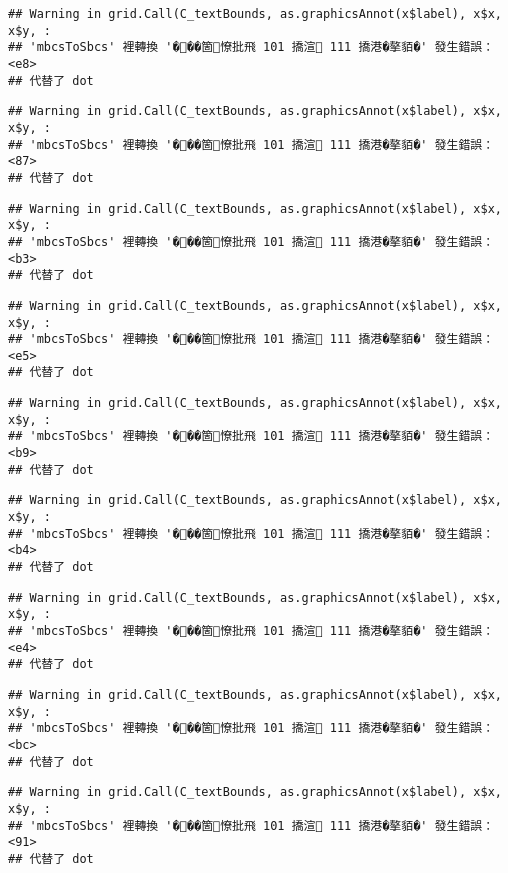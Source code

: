 \documentclass[
]{article}
\begin{document}
\begin{verbatim}
## Warning in grid.Call(C_textBounds, as.graphicsAnnot(x$label), x$x, x$y, :
## 'mbcsToSbcs' 裡轉換 '���箇憭批飛 101 撟渲 111 撟港�摮貊�' 發生錯誤：<e8>
## 代替了 dot
\end{verbatim}

\begin{verbatim}
## Warning in grid.Call(C_textBounds, as.graphicsAnnot(x$label), x$x, x$y, :
## 'mbcsToSbcs' 裡轉換 '���箇憭批飛 101 撟渲 111 撟港�摮貊�' 發生錯誤：<87>
## 代替了 dot
\end{verbatim}

\begin{verbatim}
## Warning in grid.Call(C_textBounds, as.graphicsAnnot(x$label), x$x, x$y, :
## 'mbcsToSbcs' 裡轉換 '���箇憭批飛 101 撟渲 111 撟港�摮貊�' 發生錯誤：<b3>
## 代替了 dot
\end{verbatim}

\begin{verbatim}
## Warning in grid.Call(C_textBounds, as.graphicsAnnot(x$label), x$x, x$y, :
## 'mbcsToSbcs' 裡轉換 '���箇憭批飛 101 撟渲 111 撟港�摮貊�' 發生錯誤：<e5>
## 代替了 dot
\end{verbatim}

\begin{verbatim}
## Warning in grid.Call(C_textBounds, as.graphicsAnnot(x$label), x$x, x$y, :
## 'mbcsToSbcs' 裡轉換 '���箇憭批飛 101 撟渲 111 撟港�摮貊�' 發生錯誤：<b9>
## 代替了 dot
\end{verbatim}

\begin{verbatim}
## Warning in grid.Call(C_textBounds, as.graphicsAnnot(x$label), x$x, x$y, :
## 'mbcsToSbcs' 裡轉換 '���箇憭批飛 101 撟渲 111 撟港�摮貊�' 發生錯誤：<b4>
## 代替了 dot
\end{verbatim}

\begin{verbatim}
## Warning in grid.Call(C_textBounds, as.graphicsAnnot(x$label), x$x, x$y, :
## 'mbcsToSbcs' 裡轉換 '���箇憭批飛 101 撟渲 111 撟港�摮貊�' 發生錯誤：<e4>
## 代替了 dot
\end{verbatim}

\begin{verbatim}
## Warning in grid.Call(C_textBounds, as.graphicsAnnot(x$label), x$x, x$y, :
## 'mbcsToSbcs' 裡轉換 '���箇憭批飛 101 撟渲 111 撟港�摮貊�' 發生錯誤：<bc>
## 代替了 dot
\end{verbatim}

\begin{verbatim}
## Warning in grid.Call(C_textBounds, as.graphicsAnnot(x$label), x$x, x$y, :
## 'mbcsToSbcs' 裡轉換 '���箇憭批飛 101 撟渲 111 撟港�摮貊�' 發生錯誤：<91>
## 代替了 dot
\end{verbatim}
\end{document}
